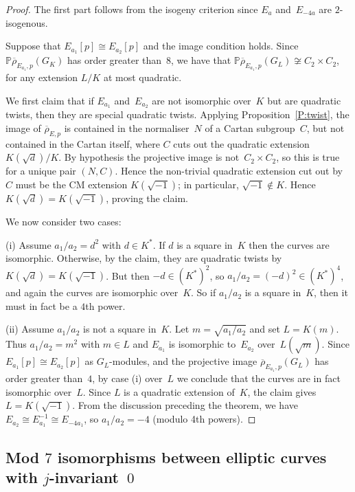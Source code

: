 \documentclass[12pt, reqno]{amsart}
\newcommand{\PP}{\mathbb{P}}
\newcommand{\rhobar}{{\overline{\rho}}}
\numberwithin{equation}{section}
\theoremstyle{definition}
\theoremstyle{remark}
\begin{document}
\begin{proof}
The first part follows from the isogeny criterion since $E_a$
and~$E_{-4a}$ are $2$-isogenous.

Suppose that $E_{a_1}[p]\cong E_{a_2}[p]$ and the image condition
holds.  Since $\PP \rhobar_{E_{a_1},p}(G_K)$ has order greater than~$8$,
we have that $\PP \rhobar_{E_{a_1},p}(G_L)\not\cong C_2\times C_2$, for any extension $L/K$ at most quadratic.

We first claim that if $E_{a_1}$ and~$E_{a_2}$ are not isomorphic
over~$K$ but are quadratic twists, then they are special quadratic
twists.
Applying Proposition~\ref{P:twist}, the image of $\rhobar_{E,p}$ is
contained in the normaliser~$N$ of a Cartan subgroup~$C$, but not
contained in the Cartan itself, where $C$ cuts out the quadratic
extension $K(\sqrt{d})/K$.  By hypothesis the projective image is
not~$C_2\times C_2$, so this is true for a unique pair $(N,C)$.  Hence
the non-trivial quadratic extension cut out by $C$ must be the CM
extension $K(\sqrt{-1})$; in particular, $\sqrt{-1} \not\in K$.  Hence
$K(\sqrt{d})=K(\sqrt{-1})$, proving the claim.

We now consider two cases:

(i) Assume $a_1/a_2 = d^2$ with $d\in K^*$. If $d$ is a square in~$K$
then the curves are isomorphic.  Otherwise, by the claim, they are
quadratic twists by~$K(\sqrt{d})=K(\sqrt{-1})$.  But then
$-d\in(K^*)^2$, so $a_1/a_2=(-d)^2\in(K^*)^4$, and again the curves
are isomorphic over~$K$.  So if $a_1/a_2$ is a square in~$K$, then it must in
fact be a $4$th power.

(ii) Assume $a_1/a_2$ is not a square in~$K$.  Let $m=\sqrt{a_1/a_2}$
and set $L=K(m)$. Thus $a_1/a_2 = m^2$ with $m \in L$ and $E_{a_1}$ is
isomorphic to~$E_{a_2}$ over~$L(\sqrt{m})$.  Since $E_{a_1}[p]\cong
E_{a_2}[p]$ as $G_L$-modules, and the projective image $\rhobar_{E_{a_1},p}(G_L)$
has order greater than~$4$, by case (i) over~$L$ we conclude that the
curves are in fact isomorphic over~$L$.  Since $L$ is a quadratic
extension of~$K$, the claim gives $L=K(\sqrt{-1})$.  From the discussion preceding the theorem, we have
$E_{a_2}\cong E_{a_1}^{-1} \cong E_{-4a_1}$, so $a_1/a_2 = -4$ (modulo
4th powers).
\end{proof}

\subsection{Mod $7$ isomorphisms between elliptic curves with
  $j$-invariant~$0$}
\end{document}
